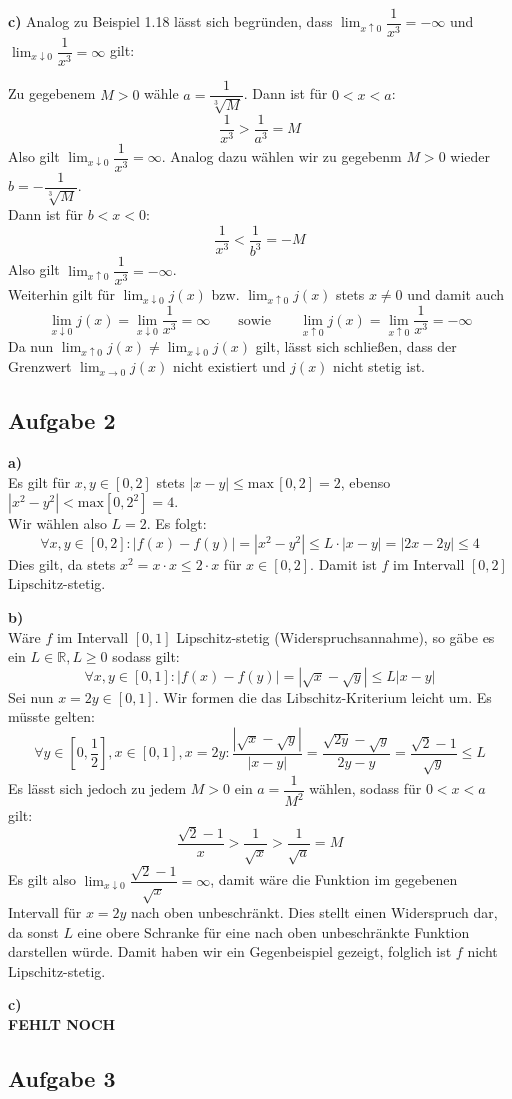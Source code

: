 \documentclass[a4paper,graphics,11pt]{article}
\newcommand{\aufgabe}[1]{\subsection*{Aufgabe #1}}
\begin{document}
\textbf{c)}
Analog zu Beispiel 1.18 lässt sich begründen, dass
$\lim_{x \uparrow 0}\limits\dfrac{1}{x^3} = -\infty$ und
$\lim_{x \downarrow 0}\limits\dfrac{1}{x^3} = \infty$ gilt:

Zu gegebenem $M > 0$ wähle $a= \dfrac{1}{\sqrt[3]{M}}$. Dann ist für $0 < x < a$:
$$
    \frac{1}{x^3} > \frac{1}{a^3} = M
$$
Also gilt $\lim_{x \downarrow 0}\limits \dfrac{1}{x^3} = \infty$. Analog dazu
wählen wir zu gegebenm $M>0$ wieder $b= -\dfrac{1}{\sqrt[3]{M}}$.\\
Dann ist für $b < x < 0$:
$$
    \frac{1}{x^3} < \frac{1}{b^3} = -M
$$
Also gilt $\lim_{x \uparrow 0}\limits \dfrac{1}{x^3} = -\infty$.\\
Weiterhin gilt für $\lim_{x \downarrow 0} j(x)$ bzw. $\lim_{x \uparrow 0} j(x)$ stets $x\neq0$ und damit auch
$$
    \lim_{x \downarrow 0} j(x) = \lim_{x \downarrow 0} \frac{1}{x^3} = \infty
    \qquad\text{sowie}\qquad
    \lim_{x \uparrow 0} j(x) = \lim_{x \uparrow 0} \frac{1}{x^3} = -\infty
$$
Da nun $\lim_{x \uparrow 0}\limits j(x) \neq \lim_{x \downarrow 0}\limits j(x)$ gilt,
lässt sich schließen, dass der Grenzwert $\lim_{x \to 0}\limits j(x)$ nicht existiert und
$j(x)$ nicht stetig ist.

\aufgabe{2}

\textbf{a)}\\
Es gilt für $x,y \in [0,2]$ stets $|x-y| \leq \text{max}\,[0,2] = 2$,
ebenso $|x^2-y^2| < \text{max} [0,2^2] = 4$.\\
Wir wählen also $L = 2$. Es folgt:
$$
    \forall x,y \in [0,2] \colon |f(x)-f(y)| = |x^2-y^2| \leq L \cdot |x-y| = |2x-2y| \leq 4
$$
Dies gilt, da stets $x^2 = x\cdot x \leq 2\cdot x$ für $x \in [0,2]$.
Damit ist $f$ im Intervall $[0,2]$ Lipschitz-stetig.


\textbf{b)}\\
Wäre $f$ im Intervall $[0,1]$ Lipschitz-stetig (Widerspruchsannahme), so gäbe es
ein $L \in \mathbb{R}, L \geq 0$ sodass gilt:
$$
    \forall x,y \in [0,1] \colon |f(x)-f(y)| = |\sqrt{x} -\sqrt{y} | \leq L |x-y|
$$
Sei nun $x = 2y \in [0,1]$. Wir formen die das Libschitz-Kriterium leicht um. Es müsste
gelten:
$$
    \forall y \in \left[0,\frac{1}{2}\right], x \in [0,1], x = 2y\colon
    \frac{|\sqrt{x} - \sqrt{y}|}{|x-y|}
    = \frac{\sqrt{2y} - \sqrt{y}}{2y-y}
    = \frac{\sqrt{2} - 1}{\sqrt{y}} \leq L
$$
Es lässt sich jedoch zu jedem $M > 0$ ein $a = \dfrac{1}{M^2}$ wählen, sodass für $0 < x < a$ gilt:
$$
    \frac{\sqrt{2}-1}{x} > \frac{1}{\sqrt{x}} > \frac{1}{\sqrt{a}} = M
$$
Es gilt also $\lim_{x \downarrow 0}\limits \dfrac{\sqrt{2} - 1}{\sqrt{x}} = \infty$,
damit wäre die Funktion im gegebenen Intervall für $x = 2y$ nach oben unbeschränkt.
Dies stellt einen Widerspruch dar, da sonst $L$ eine obere Schranke
für eine nach oben unbeschränkte Funktion darstellen würde. Damit haben wir ein
Gegenbeispiel gezeigt, folglich ist $f$ nicht Lipschitz-stetig.
\newpage

\textbf{c)}\\
\textbf{FEHLT NOCH}


\aufgabe{3}
\end{document}
